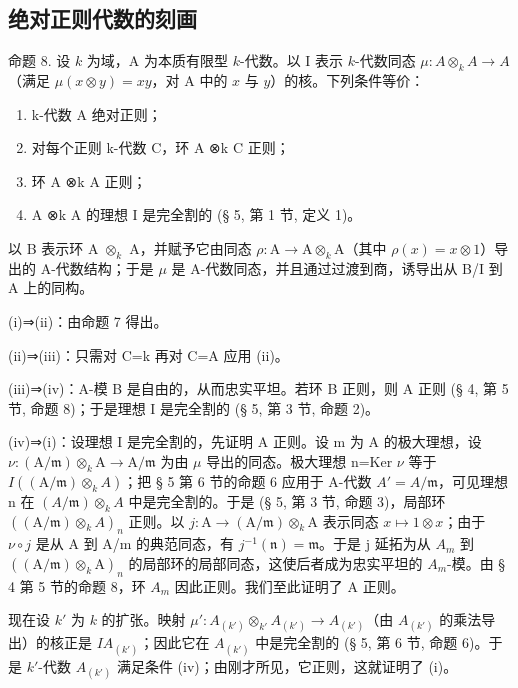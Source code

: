 \subsection{绝对正则代数的刻画}

命题 8. 设 \(k\) 为域，A 为本质有限型 \(k\)-代数。以 I 表示 \(k\)-代数同态 \(\mu: A \otimes_k A \to A\)（满足 \(\mu(x \otimes y) = xy\)，对 A 中的 \(x\) 与 \(y\)）的核。下列条件等价：

\begin{enumerate}
\def\labelenumi{(\roman{enumi})}
\item
  k-代数 A 绝对正则；
\item
  对每个正则 k-代数 C，环 A ⊗k C 正则；
\item
  环 A ⊗k A 正则；
\item
  A ⊗k A 的理想 I 是完全割的 (§ 5, 第 1 节, 定义 1)。
\end{enumerate}

以 B 表示环 A \(\otimes_{k}\) A，并赋予它由同态 \(\rho: \mathrm{A} \to \mathrm{A} \otimes_{k} \mathrm{A}\)（其中 \(\rho(x) = x \otimes 1\)）导出的 A-代数结构；于是 \(\mu\) 是 A-代数同态，并且通过过渡到商，诱导出从 B/I 到 A 上的同构。

(i)⇒(ii)：由命题 7 得出。

(ii)⇒(iii)：只需对 C=k 再对 C=A 应用 (ii)。

(iii)⇒(iv)：A-模 B 是自由的，从而忠实平坦。若环 B 正则，则 A 正则 (§ 4, 第 5 节, 命题 8)；于是理想 I 是完全割的 (§ 5, 第 3 节, 命题 2)。

(iv)⇒(i)：设理想 I 是完全割的，先证明 A 正则。设 m 为 A 的极大理想，设 \(\nu:(\mathrm{A}/\mathfrak{m})\otimes_{k}\mathrm{A}\to\mathrm{A}/\mathfrak{m}\) 为由 \(\mu\) 导出的同态。极大理想 n=Ker \(\nu\) 等于 \(I((\mathrm{A}/\mathfrak{m})\otimes_{k}A)\)；把 § 5 第 6 节的命题 6 应用于 A-代数 \(A'=A/\mathfrak m\)，可见理想 n 在 \((A/\mathfrak{m})\otimes_{k}A\) 中是完全割的。于是 (§ 5, 第 3 节, 命题 3)，局部环 \(((\mathrm{A}/\mathfrak{m})\otimes_{k}A)_{n}\) 正则。以 \(j:\mathrm{A}\to(\mathrm{A}/\mathfrak{m})\otimes_{k}\mathrm{A}\) 表示同态 \(x\mapsto1\otimes x\)；由于 \(\nu\circ j\) 是从 A 到 A/m 的典范同态，有 \(j^{-1}(\mathfrak{n})=\mathfrak{m}\)。于是 j 延拓为从 \(A_{m}\) 到 \(((\mathrm{A}/\mathfrak{m})\otimes_{k}\mathrm{A})_{n}\) 的局部环的局部同态，这使后者成为忠实平坦的 \(A_{m}\)-模。由 § 4 第 5 节的命题 8，环 \(A_{m}\) 因此正则。我们至此证明了 A 正则。

现在设 \(k'\) 为 \(k\) 的扩张。映射 \(\mu': A_{(k')} \otimes_{k'} A_{(k')} \to A_{(k')}\)（由 \(A_{(k')}\) 的乘法导出）的核正是 \(IA_{(k')}\)；因此它在 \(A_{(k')}\) 中是完全割的 (§ 5, 第 6 节, 命题 6)。于是 \(k'\)-代数 \(A_{(k')}\) 满足条件 (iv)；由刚才所见，它正则，这就证明了 (i)。

